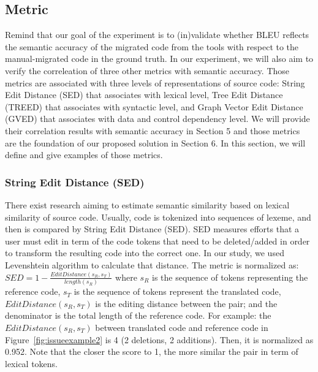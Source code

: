 \subsection{Metric} 
%

Remind that our goal of the experiment is to (in)validate whether BLEU
reflects the semantic accuracy of the migrated code from the tools
with respect to the manual-migrated code in the ground truth. In our
experiment, we will also aim to verify the correleation of three other
metrics with semantic accuracy. Those metrics are associated with
three levels of representations of source code: String Edit Distance
(SED) that associates with lexical level, Tree Edit Distance (TREED)
that associates with syntactic level, and Graph Vector Edit Distance
(GVED) that associates with data and control dependency level. We will
provide their correlation results with semantic accuracy in Section 5
and those metrics are the foundation of our proposed solution in
Section 6. In this section, we will define and give examples of those
metrics.

\subsubsection{\textbf{String Edit Distance (SED)}}There exist 
research aiming to estimate semantic similarity based on lexical
similarity of source code. Usually, code is tokenized into sequences
of lexeme, and then is compared by String Edit Distance (SED). SED
measures efforts that a user must edit in term of the code tokens that
need to be deleted/added in order to transform the resulting code into
the correct one. In our study, we used Levenshtein algorithm to
calculate that distance. The metric is normalized as: $SED = 1 -
\frac{EditDistance\left(s_R, s_T\right)}{length\left(s_R\right)}$
where $s_R$ is the sequence of tokens representing the reference code,
$s_T$ is the sequence of tokens represent the translated code,
$EditDistance\left(s_R, s_T\right)$ is the editing distance between
the pair; and the denominator is the total length of the reference
code. For example: the $EditDistance\left(s_R, s_T\right)$ between
translated code and reference code in Figure~\ref{fig:issueexample2}
is 4 (2 deletions, 2 additions). Then, it is normalized as 0.952. Note
that the closer the score to 1, the more similar the pair in term of
lexical tokens.

